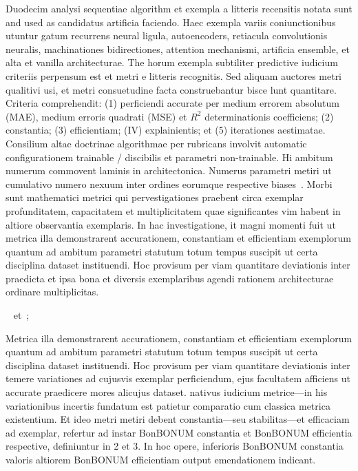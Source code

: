 \documentclass[preprint,3p,times,twocolumn]{elsarticle}  %
\begin{document}
Duodecim analysi sequentiae algorithm et exempla a litteris recensitis notata sunt
and used as candidatus artificia faciendo. Haec exempla variis coniunctionibus utuntur
gatum recurrens neural ligula,
autoencoders, retiacula convolutionis neuralis, machinationes bidirectiones, attention
mechanismi, artificia ensemble, et alta et vanilla architecturae. The
horum exempla subtiliter predictive iudicium criteriis perpensum est
et metri e litteris recognitis. Sed aliquam
auctores metri qualitivi usi, et metri consuetudine facta construebantur
bisce lunt quantitare. Criteria comprehendit: (1) perficiendi
accurate per medium errorem absolutum (MAE), medium erroris quadrati (MSE) et
$R^2$ determinationis coefficiens; (2) constantia; (3) efficientiam; (IV) explainientis;
et (5) iterationes aestimatae. Consilium altae doctrinae algorithmae
per rubricans involvit automatic configurationem trainable / discibilis
et parametri non-trainable. Hi ambitum numerum commovent
laminis in architectonica. Numerus parametri metiri
ut cumulativo numero nexuum inter ordines eorumque
respective biases~\citep{probst19}. Morbi sunt
mathematici metrici qui pervestigationes praebent circa exemplar profunditatem,
 capacitatem et multiplicitatem quae significantes vim habent in altiore 
observantia exemplaris. In hac investigatione, it magni momenti fuit ut 
metrica illa demonstrarent accurationem, constantiam et efficientiam exemplorum 
quantum ad ambitum parametri statutum totum tempus suscipit ut certa disciplina 
dataset instituendi. Hoc provisum per viam quantitare deviationis inter 
praedicta et ipsa bona et diversis exemplaribus agendi rationem architecturae 
ordinare multiplicitas. 

\lipsum[31-31]
~\citep{sengupta96} et~\citep{hossin15}; 

Metrica illa demonstrarent accurationem, constantiam et efficientiam exemplorum 
quantum ad ambitum parametri statutum totum tempus suscipit ut certa disciplina 
dataset instituendi. Hoc provisum per viam quantitare deviationis inter 
temere variationes ad cujusvis exemplar perficiendum, ejus facultatem afficiens
ut accurate praedicere mores alicujus dataset. nativus iudicium
metrice---in his variationibus incertis fundatum est patietur comparatio cum
classica metrica existentium. Et ideo metri metiri debent
constantia---seu stabilitas---et efficaciam ad exemplar, refertur
ad instar BonBONUM constantia et BonBONUM efficientia respective, definiuntur
in 2 et 3. In hoc opere, inferioris BonBONUM constantia valoris
altiorem BonBONUM efficientiam output emendationem indicant.
\end{document}
